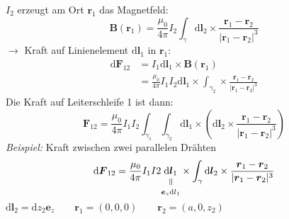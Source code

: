 \documentclass[titlepage,11pt,a4paper,ngerman]{report}
\newcommand{\tx}[1]{\textrm{#1}}
\newcommand{\dd}{\tx{d}}
\newcommand{\verteq}{\rotatebox{90}{$\,=$}}
\newcommand{\equalto}[2]{\underset{\scriptstyle\overset{\mkern4mu\verteq}{#2}}{#1}}
\renewcommand{\vec}[1]{\boldsymbol{#1}}
\begin{document}
$ I_2 $ erzeugt am Ort $ \vec{r}_1 $ das Magnetfeld:
\begin{equation*}
\vec{B}(\vec{r}_1)  = \frac{\mu_0}{4 \pi} I_2 \int_{\gamma} \dd \vec{l}_2 \times \frac{\vec{r}_1 - \vec{r}_2}{|\vec{r}_1 - \vec{r}_2|^3}
\end{equation*}
$ \rightarrow $ Kraft auf Linienelement $ \dd \vec{l}_1 $ in $  \vec{r}_1 $:
\begin{align*}
\dd \vec{F}_{12} &= I_1 \dd \vec{l}_1 \times \vec{B}(\vec{r}_1)\\
&= \frac{\mu_0}{4 \pi} I_1 I_2 \dd \vec{l}_1 \times \int_{\gamma_{2}} \times \frac{\vec{r}_1 - \vec{r}_2}{|\vec{r}_1 - \vec{r}_2|^3}
\end{align*}
Die Kraft auf Leiterschleife 1 ist dann:
\begin{equation*}
\vec{F}_{12} = \frac{\mu_0}{4 \pi} I_1 I_2 \int_{\gamma_1} \int_{\gamma_2} \dd \vec{l}_1 \times \left(\dd \vec{l}_2 \times \frac{\vec{r}_1 - \vec{r}_2}{|\vec{r}_1 - \vec{r}_2|^3}\right)
\end{equation*}
\emph{Beispiel:} Kraft zwischen zwei parallelen Drähten\\


\begin{equation*}
\dd \vec{F}_{12} = \frac{\mu_0}{4 \pi} I_1 I2 \equalto{\dd \vec{l}_1}{\vec{e}_z \dd l_1} \times \int_{\gamma} \dd \vec{l}_2 \times \frac{\vec{r}_1 - \vec{r}_2}{|\vec{r}_1 - \vec{r}_2|^3}
\end{equation*}
$ \dd \vec{l}_2 = \dd z_2 \vec{e}_z \qquad \vec{r}_1  = (0,0,0) \qquad \vec{r}_2 = (a,0,z_2) $
\end{document}
